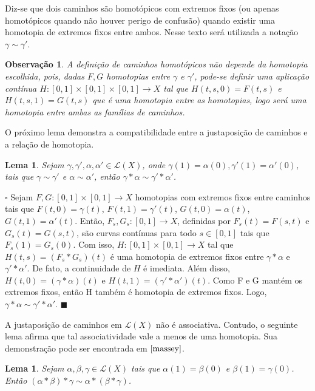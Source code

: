 \documentclass[12pt]{book}
\newtheorem{lema}[teorema]{Lema}
\newtheorem{observacao}[teorema]{Observação}
\newenvironment{prova}[1]{$\square$ #1}{\hfill$\blacksquare$}
\newcommand{\caminhos}{\mathcal{L}}
\newcommand{\caminhossempontobase}[1]{\caminhos(#1)}
\newcommand{\intervalo}{[0,1]}
\begin{document}
	Diz-se que dois caminhos são homotópicos com extremos fixos (ou apenas homotópicos quando não houver perigo de confusão) quando existir uma homotopia de extremos fixos entre ambos. Nesse texto será utilizada a notação $\gamma \sim \gamma'$.
	
	\begin{observacao}
		A definição de caminhos homotópicos não depende da homotopia escolhida, pois, dadas $F,G$ homotopias entre $\gamma$ e $\gamma'$, pode-se definir uma aplicação contínua $H: [0,1] \times [0,1] \times [0,1] \to X$ tal que $H(t,s ,0) = F(t,s)$ e $H(t,s, 1) = G(t,s)$ que é uma homotopia entre as homotopias, logo será uma homotopia entre ambas as famílias de caminhos.
	\end{observacao}
	
	O próximo lema demonstra a compatibilidade entre a justaposição de caminhos e a relação de homotopia.
	
	\begin{lema}\label{lema_compatibilidade_produto_caminhos}
		Sejam $\gamma, \gamma', \alpha, \alpha' \in \caminhossempontobase{X}$, onde $\gamma(1) = \alpha(0), \gamma'(1) = \alpha'(0) $, tais que $\gamma \sim \gamma'$ e $\alpha \sim \alpha'$, então $\gamma * \alpha \sim \gamma' * \alpha'$.
	\end{lema}
	\begin{prova}
		Sejam  $F, G:[0,1] \times [0,1] \to X$ homotopias com extremos fixos entre caminhos tais que $F(t,0)=\gamma(t)$, $F(t,1)=\gamma'(t)$, $G(t,0)=\alpha(t)$, $G(t,1)=\alpha'(t)$. Então, $F_{s}, G_{s}:\intervalo \to X$, definidas por $F_{s}(t) = F(s,t)$ e $G_{s}(t) = G(s,t)$, são curvas contínuas para todo $s \in \intervalo$ tais que $F_{s}(1) = G_{s}(0)$. Com isso, $H :\intervalo\times \intervalo\to X$ tal que $H(t, s)=(F_{s}*G_{s})(t)$ é uma homotopia de extremos fixos entre $\gamma*\alpha$ e $\gamma'*\alpha'$. De fato, a continuidade de $H$ é imediata. Além disso, $H(t, 0) = (\gamma*\alpha)(t)$ e $H(t, 1) = (\gamma'*\alpha')(t)$. Como F e G mantém os extremos fixos, então H também é homotopia de extremos fixos. Logo, $\gamma*\alpha \sim \gamma'*\alpha'$.
	\end{prova}
	
	A justaposição de caminhos em $\caminhossempontobase{X}$ não é associativa. Contudo, o seguinte lema afirma que tal associatividade vale a menos de uma homotopia. Sua demonstração pode ser encontrada em $\cite{massey}$.
	
	\begin{lema}\label{lema_associatividade_produto_caminhos}
		Sejam $\alpha, \beta, \gamma\in \caminhossempontobase{X}$ tais que $\alpha(1)=\beta(0)$ e $\beta(1)=\gamma(0)$. Então $(\alpha*\beta)*\gamma \sim \alpha*(\beta*\gamma)$.
	\end{lema}
	
\end{document}
